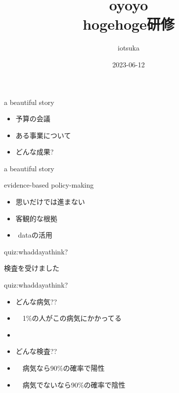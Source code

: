 \documentclass[
  ignorenonframetext,
]{beamer}
\title{oyoyo\\
hogehoge研修}
\author{iotsuka}
\date{2023-06-12}
\providecommand{\tightlist}{%
  \setlength{\itemsep}{0pt}\setlength{\parskip}{0pt}}
\begin{document}
\frame{\titlepage}

\begin{frame}{a beautiful story}
\protect\hypertarget{a-beautiful-story}{}
\Huge

\begin{itemize}[<+->]
\tightlist
\item
  \textbullet{}\hspace{3pt}予算の会議
\item
  \textbullet{}\hspace{3pt}ある事業について
\item
  \textbullet{}\hspace{3pt}どんな成果?
\end{itemize}
\end{frame}

\begin{frame}{a beautiful story}
\protect\hypertarget{a-beautiful-story-1}{}
\end{frame}

\begin{frame}{evidence-based policy-making}
\protect\hypertarget{evidence-based-policy-making}{}
\Huge

\begin{itemize}[<+->]
\tightlist
\item
  \textbullet{}\hspace{3pt}思いだけでは進まない \bigskip
\item
  \textbullet{}\hspace{3pt}客観的な根拠 \bigskip
\item
  \mbox{}\hfill{}{\textrightarrow{}\,\,{}}dataの活用
\end{itemize}
\end{frame}

\begin{frame}{quiz:whaddayathink?}
\protect\hypertarget{quizwhaddayathink}{}
\Huge

検査を受けました
\end{frame}

\begin{frame}{quiz:whaddayathink?}
\protect\hypertarget{quizwhaddayathink-1}{}
\LARGE

\begin{itemize}
\item どんな病気??
\pause
\item 　\textbullet{}\hspace{2pt}1\%の人がこの病気にかかってる
\pause
\item 
\item どんな検査??
\pause
\item 　\textbullet{}\hspace{2pt}病気なら90\%の確率で陽性
\pause
\item 　\textbullet{}\hspace{2pt}病気でないなら90\%の確率で陰性
\end{itemize}
\end{frame}
\end{document}
